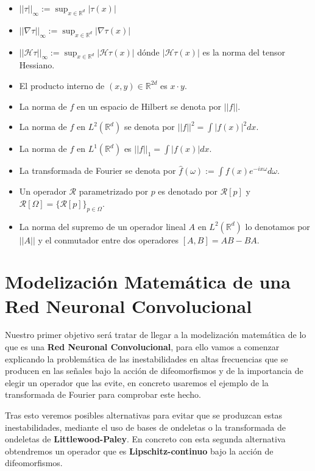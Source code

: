 \begin{itemize}
    \item $|| \tau ||_\infty := \sup_{x \in \mathbb{R}^d} |\tau(x)|$
    \item $||\nabla \tau ||_\infty := \sup_{x \in \mathbb{R}^d} |\nabla \tau(x)|$
    \item $||\mathcal{H} \tau ||_\infty := \sup_{x \in \mathbb{R}^d} |\mathcal{H} \tau(x)|$ dónde $|\mathcal{H} \tau(x)|$ es la norma del tensor Hessiano. 
    \item El producto interno de $(x,y) \in \mathbb{R}^{2d}$ es $x\cdot y$.
    \item La norma de $f$ en un espacio de Hilbert se denota por $||f||$.
    \item La norma de $f$ en $L^2(\mathbb{R}^d)$ se denota por $||f||^2=\int{|f(x)|^2 dx}$.
    \item La norma de $f$ en $L^1(\mathbb{R}^d)$ es $||f||_1=\int{|f(x)| dx}$.
    \item La transformada de Fourier se denota por $\widehat{f}(\omega):= \int{f(x)e^{-ix\omega}d\omega}$.
    \item Un operador  $\mathcal{R}$ parametrizado por $p$ es denotado por $\mathcal{R}[p]$ y $\mathcal{R}[\Omega]=\lbrace \mathcal{R}[p] \rbrace_{p \in \Omega}$. 
    \item La norma del supremo de un operador lineal $A$ en $L^2(\mathbb{R}^d)$ lo denotamos por $||A||$ y el conmutador entre dos operadores $[A,B]=AB-BA$.
\end{itemize}

\section{Modelización Matemática de una Red Neuronal Convolucional} \label{ch:seccion12}

\noindent Nuestro primer objetivo será tratar de llegar a la modelización matemática de lo que es una \textbf{Red Neuronal Convolucional}, para ello vamos a comenzar explicando la problemática de las inestabilidades en altas frecuencias que se producen en las señales bajo la acción de difeomorfismos y de la importancia de elegir un operador que las evite, en concreto usaremos el ejemplo de la transformada de Fourier para comprobar este hecho. 

\medskip

\noindent Tras esto  veremos posibles alternativas para evitar que se produzcan estas inestabilidades, mediante el uso de bases de ondeletas o la transformada de ondeletas de \textbf{Littlewood-Paley}. En concreto con esta segunda alternativa obtendremos un operador que es \textbf{Lipschitz-continuo} bajo la acción de difeomorfismos. 

